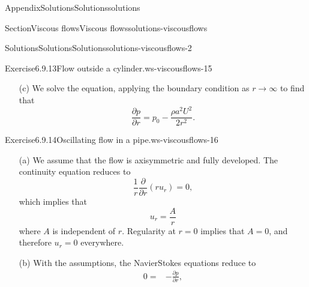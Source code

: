 \documentclass[oneside,10pt,]{book}
\numberwithin{equation}{section}
\newcommand{\pd}[2]{\frac{\partial#1}{\partial#2}}
\begin{document}
\begin{appendixptx}{Appendix}{Solutions}{}{Solutions}{}{}{solutions}
\begin{sectionptx}{Section}{Viscous flows}{}{Viscous flows}{}{}{solutions-viscousflows}
\begin{solutions-subsection-numberless}{Solutions}{Solutions}{}{Solutions}{}{}{solutions-viscousflows-2}
\begin{divisionsolution}{Exercise}{6.9.13}{Flow outside a cylinder.}{ws-viscousflows-15}
\begin{enumerate}[font=\bfseries,label=(\alph*),ref=\alph*]
\begin{align*}
\end{align*}
and%
\begin{equation*}
\nabla^2u_r
=\frac1r\pd{}{r}\left(r\pd{u_r}{r}\right)
=\pd{^2u_r}{r^2}+\frac1r\pd{u_r}{r}.
\end{equation*}
Hence, the only non-trivial equation is the \(r\)-component, which reduces to%
\begin{equation*}
\rho u_r\pd{u_r}{r}
=-\pd{p}{r}
+\mu\left(\pd{^2u_r}{r^2}+\frac1r\pd{u_r}{r}-\frac{u_r}{r^2}\right).
\end{equation*}
Substituting the expression for \(u_r\),%
\begin{equation*}
\rho \left(-\frac{aU}{r}\right)\left(\frac{aU}{r^2}\right)
=-\pd{p}{r}
+\mu\left(-\frac{2aU}{r^3}+\frac{aU}{r^3}+\frac{aU}{r^3}\right),
\end{equation*}
which simplifies to%
\begin{equation*}
\pd{p}{r}=\frac{\rho a^2U^2}{r^3},
\end{equation*}
as required.%
\item[(c)]\noindent\hypertarget{ws-viscousflows-15-5-2-main}{}We solve the equation, applying the boundary condition as \(r\rightarrow\infty\) to find that%
\begin{equation*}
\pd{p}{r}=p_0-\frac{\rho a^2U^2}{2r^2}.
\end{equation*}
%
\end{enumerate}%
\end{divisionsolution}%
\begin{divisionsolution}{Exercise}{6.9.14}{Oscillating flow in a pipe.}{ws-viscousflows-16}%
\begin{enumerate}[font=\bfseries,label=(\alph*),ref=\alph*]%
\item[(a)]\noindent\hypertarget{ws-viscousflows-16-3-2-main}{}We assume that the flow is axisymmetric and fully developed. The continuity equation reduces to%
\begin{equation*}
\frac1r\pd{}{r}\left(ru_r\right)=0,
\end{equation*}
which implies that%
\begin{equation*}
u_r=\frac{A}{r}
\end{equation*}
where \(A\) is independent of \(r\). Regularity at \(r=0\) implies that \(A=0\), and therefore \(u_r=0\) everywhere.%
\item[(b)]\noindent\hypertarget{ws-viscousflows-16-4-2-main}{}With the assumptions, the Navier\textendash{}Stokes equations reduce to%
\begin{align*}
0=&-\pd{p}{r},\\

\end{align*}
\end{enumerate}
\end{divisionsolution}
\end{solutions-subsection-numberless}
\end{sectionptx}
\end{appendixptx}
\end{document}
